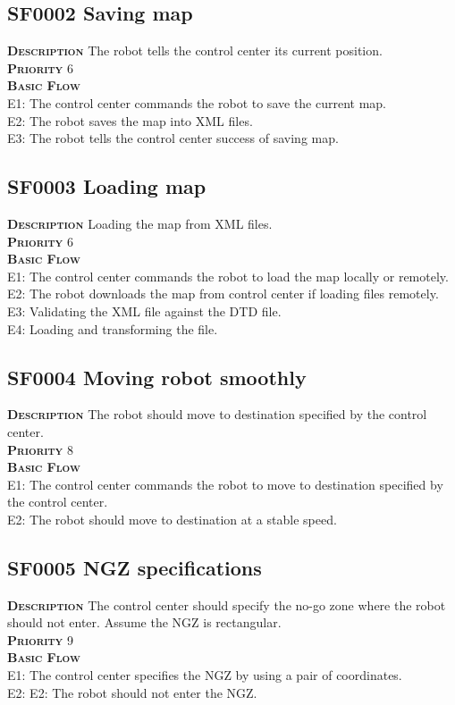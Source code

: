 \documentclass[11pt, a4paper]{article}
\begin{document}
\subsection{SF0002 Saving map }
\textsc{\bfseries Description} The robot tells the control center its current position.\\
\textsc{\bfseries Priority} 6\\
\textsc{\bfseries Basic Flow} \\
\textsc{E1:} The control center commands the robot to save the current map.\\
\textsc{E2:} The robot saves the map into XML files.\\
\textsc{E3:} The robot tells the control center success of saving map.\\

\subsection{SF0003 Loading map}
\textsc{\bfseries Description} Loading the map from XML files.\\
\textsc{\bfseries Priority} 6\\
\textsc{\bfseries Basic Flow} \\
\textsc{E1:} The control center commands the robot to load the map locally or remotely.\\
\textsc{E2:} The robot downloads the map from control center if loading files remotely.\\
\textsc{E3:} Validating the XML file against the DTD file.\\
\textsc{E4:} Loading and transforming the file.\\

\subsection{SF0004 Moving robot smoothly}
\textsc{\bfseries Description} The robot should move to destination specified by the control center.\\
\textsc{\bfseries Priority} 8\\
\textsc{\bfseries Basic Flow} \\
\textsc{E1:} The control center commands the robot to move to destination specified by the control center.\\
\textsc{E2:} The robot should move to destination at a stable speed.\\

\subsection{SF0005 NGZ specifications}
\textsc{\bfseries Description} The control center should specify the no-go zone where the robot should not enter. Assume the NGZ is rectangular.\\
\textsc{\bfseries Priority} 9\\
\textsc{\bfseries Basic Flow} \\
\textsc{E1:} The control center specifies the NGZ by using a pair of coordinates.\\
\textsc{E2:} E2: The robot should not enter the NGZ.\\
\end{document}
